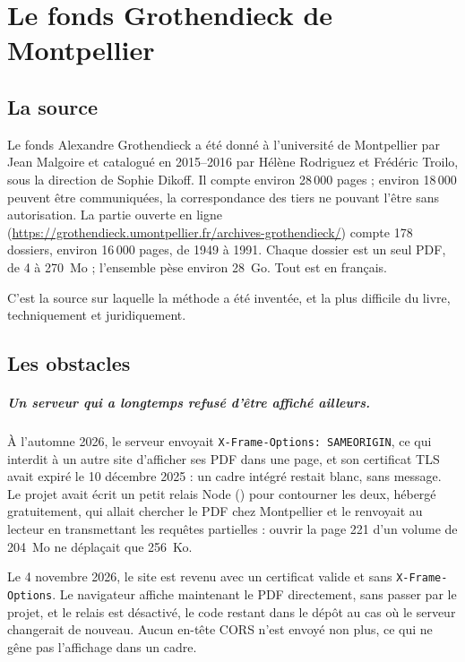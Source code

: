 \chapter{Le fonds Grothendieck de Montpellier}\label{ch:montpellier}

\section{La source}

Le fonds Alexandre Grothendieck a été donné à l'université de Montpellier par Jean
Malgoire et catalogué en 2015--2016 par Hélène Rodriguez et Frédéric Troilo, sous la
direction de Sophie Dikoff. Il compte environ 28\,000 pages ; environ 18\,000 peuvent être
communiquées, la correspondance des tiers ne pouvant l'être sans autorisation. La partie
ouverte en ligne (\url{https://grothendieck.umontpellier.fr/archives-grothendieck/}) compte
178 dossiers, environ 16\,000 pages, de 1949 à 1991. Chaque dossier est un seul PDF, de 4 à
270~Mo ; l'ensemble pèse environ 28~Go. Tout est en français.

C'est la source sur laquelle la méthode a été inventée, et la plus difficile du livre,
techniquement et juridiquement.

\section{Les obstacles}

\paragraph{Un serveur qui a longtemps refusé d'être affiché ailleurs.} À l'automne 2026, le serveur
envoyait \texttt{X-Frame-Options: SAMEORIGIN}, ce qui interdit à un autre site d'afficher ses PDF
dans une page, et son certificat TLS avait expiré le 10 décembre 2025 : un cadre intégré
restait blanc, sans message. Le projet avait écrit un petit relais Node
() pour contourner les deux, hébergé gratuitement, qui allait
chercher le PDF chez Montpellier et le renvoyait au lecteur en transmettant les requêtes
partielles : ouvrir la page 221 d'un volume de 204~Mo ne déplaçait que 256~Ko.

Le 4 novembre 2026, le site est revenu avec un certificat valide et sans \texttt{X-Frame-Options}.
Le navigateur affiche maintenant le PDF directement, sans passer par le projet, et le relais
est désactivé, le code restant dans le dépôt au cas où le serveur changerait de nouveau.
Aucun en-tête CORS n'est envoyé non plus, ce qui ne gêne pas l'affichage dans un cadre.

